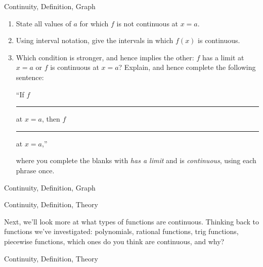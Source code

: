 \begin{tagblock}{Continuity, Definition, Graph}
\begin{question}
\begin{enumerate}
\item State all values of $a$ for which $f$ is not continuous at $x=a$.
\vspace{.75in}

\item  Using interval notation, give the intervals in which $f(x)$ is continuous.
\vspace{.75in}

\item Which condition is stronger, and hence implies the other: $f$ has a limit at $x=a$ or $f$ is continuous at $x=a$? Explain, and hence complete the following sentence: 
\bigskip

``If $f$ \rule{4cm}{.1mm} at $x=a$, then $f$  \rule{4cm}{.1mm} at  $x=a$,'' 

where you complete the blanks with \emph{has a limit} and is \emph{continuous}, using each phrase once.
\end{enumerate}
	
\begin{tags}
	   Continuity, Definition, Graph
\end{tags}
	
\begin{diary}
	  
\end{diary}


	

	\end{question}
	
	\end{tagblock}






\begin{tagblock}{Continuity, Definition, Theory}
\begin{question}
	
Next, we'll look more at what types of functions are continuous.  Thinking back to functions we've investigated: polynomials, rational functions, trig functions, piecewise functions, which ones do you think are continuous, and why? 
	
\begin{tags}
	   Continuity, Definition, Theory
\end{tags}
	
\begin{diary}
	  
\end{diary}


	

	\end{question}
	
	\end{tagblock}





